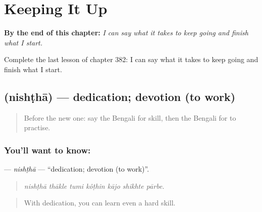
\chapter{Keeping It Up}
\label{ch:bn-keeping-it-up}

\begin{chapteropening}
\textbf{By the end of this chapter:} \emph{I can say what it takes to keep going and finish what I start.}

Complete the last lesson of chapter 382: I can say what it takes to keep going and finish what I start.
\end{chapteropening}

\section[\texorpdfstring{\bn{নিষ্ঠা} (nishṭhā)}{নিষ্ঠা (nishṭhā)}]{ (nishṭhā) — dedication; devotion (to work)}

\label{lesson:BN-C382-nishtha}



\begin{quote}
Before the new one: say the Bengali for skill, then the Bengali for to practise.
\end{quote}

\subsection*{You'll want to know: }
\textbf{} — \emph{nishṭhā} — \textquotedblleft{}dedication; devotion (to work)\textquotedblright{}.

\begin{quote}
      
\end{quote}

\begin{quote}
\emph{nishṭhā thākle tumi kôṭhin kājo shikhte pārbe.}
\end{quote}

\begin{quote}
With dedication, you can learn even a hard skill.
\end{quote}

